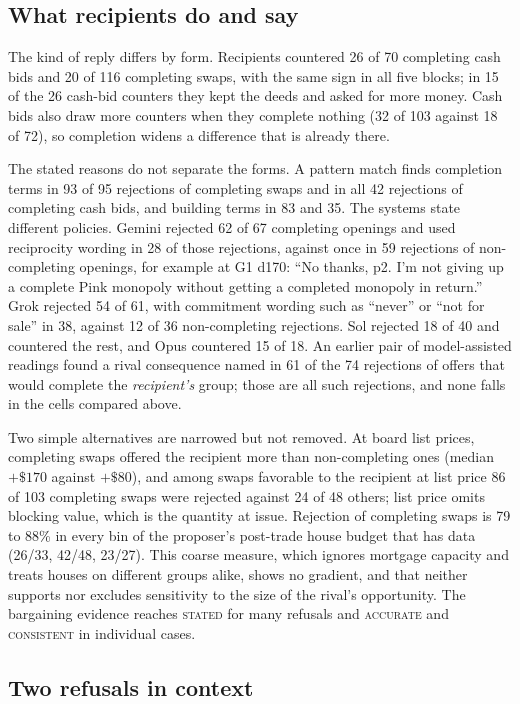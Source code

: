\documentclass[11pt,letterpaper]{article}
\newcommand{\Level}[1]{\textsc{#1}}
\begin{document}
\subsection{What recipients do and say}
The kind of reply differs by form. Recipients countered 26 of 70 completing cash bids and 20 of 116 completing swaps, with the same sign in all five blocks; in 15 of the 26 cash-bid counters they kept the deeds and asked for more money. Cash bids also draw more counters when they complete nothing (32 of 103 against 18 of 72), so completion widens a difference that is already there.

The stated reasons do not separate the forms. A pattern match finds completion terms in 93 of 95 rejections of completing swaps and in all 42 rejections of completing cash bids, and building terms in 83 and 35. The systems state different policies. Gemini rejected 62 of 67 completing openings and used reciprocity wording in 28 of those rejections, against once in 59 rejections of non-completing openings, for example at G1 d170: ``No thanks, p2. I'm not giving up a complete Pink monopoly without getting a completed monopoly in return.'' Grok rejected 54 of 61, with commitment wording such as ``never'' or ``not for sale'' in 38, against 12 of 36 non-completing rejections. Sol rejected 18 of 40 and countered the rest, and Opus countered 15 of 18. An earlier pair of model-assisted readings found a rival consequence named in 61 of the 74 rejections of offers that would complete the \emph{recipient's} group; those are all such rejections, and none falls in the cells compared above.

Two simple alternatives are narrowed but not removed. At board list prices, completing swaps offered the recipient more than non-completing ones (median $+\$170$ against $+\$80$), and among swaps favorable to the recipient at list price 86 of 103 completing swaps were rejected against 24 of 48 others; list price omits blocking value, which is the quantity at issue. Rejection of completing swaps is 79 to 88\% in every bin of the proposer's post-trade house budget that has data (26/33, 42/48, 23/27). This coarse measure, which ignores mortgage capacity and treats houses on different groups alike, shows no gradient, and that neither supports nor excludes sensitivity to the size of the rival's opportunity. The bargaining evidence reaches \Level{stated} for many refusals and \Level{accurate} and \Level{consistent} in individual cases.

\subsection{Two refusals in context}
\end{document}
